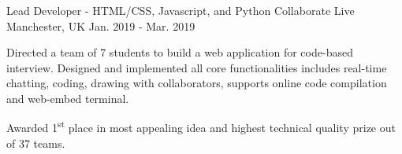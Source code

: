 \begin{cventries}
  \cventry
    {Lead Developer - HTML/CSS, Javascript, and Python} %
    {Collaborate Live} %
    {Manchester, UK} %
    {Jan. 2019 - Mar. 2019} %
    {
      \begin{cvitems} %
        \item {Directed a team of 7 students to build a web application for code-based interview. Designed and implemented all core functionalities includes real-time chatting, coding, drawing with collaborators, supports online code compilation and web-embed terminal.}
        \item {Awarded 1\textsuperscript{st} place in most appealing idea and highest technical quality prize out of 37 teams.}
      \end{cvitems}
    }
\end{cventries}
